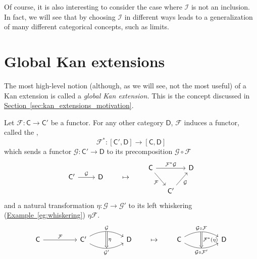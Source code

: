\documentclass[notes.tex]{subfiles}
\begin{document}
Of course, it is also interesting to consider the case where $\mathcal{I}$ is not an inclusion. In fact, we will see that by choosing $\mathcal{I}$ in different ways leads to a generalization of many different categorical concepts, such as limits.

\section{Global Kan extensions}
\label{sec:global_kan_extensions}

The most high-level notion (although, as we will see, not the most useful) of a Kan extension is called a \emph{global Kan extension.} This is the concept discussed in \hyperref[sec:kan_extensions_motivation]{Section~\ref*{sec:kan_extensions_motivation}}.

\begin{definition}[pullback]
  \label{def:pullback}
  Let $\mathcal{F}\colon \mathsf{C} \to \mathsf{C}'$ be a functor. For any other category $\mathsf{D}$, $\mathcal{F}$ induces a functor, called the ,
  \begin{equation*}
    \mathcal{F}^{*}\colon [\mathsf{C}', \mathsf{D}] \to [\mathsf{C}, \mathsf{D}]
  \end{equation*}
  which sends a functor $\mathcal{G}\colon \mathsf{C}' \to \mathsf{D}$ to its precomposition $\mathcal{G} \circ \mathcal{F}$
  \begin{equation*}
    \begin{tikzcd}
      \mathsf{C}'
      \arrow[r, "\mathcal{G}"]
      & \mathsf{D}
    \end{tikzcd}
    \qquad
    \mapsto
    \qquad
    \begin{tikzcd}[column sep=small]
      \mathsf{C}
      \arrow[dr, swap, "\mathcal{F}"]
      \arrow[rr, "\mathcal{F}^{*}\mathcal{G}"]
      && \mathsf{D}
      \\
      & \mathsf{C'}
      \arrow[ur, swap, "\mathcal{G}"]
    \end{tikzcd}
  \end{equation*}
  and a natural transformation $\eta\colon \mathcal{G} \to \mathcal{G}'$ to its left whiskering (\hyperref[eg:whiskering]{Example~\ref*{eg:whiskering}}) $\eta\mathcal{F}$.
  \begin{equation*}
    \begin{tikzcd}[column sep=huge]
      \mathsf{C}
      \arrow[r, "\mathcal{F}"]
      &\mathsf{C}'
      \arrow[r, bend left, "\mathcal{G}"{name=U}]
      \arrow[r, bend right, swap, "\mathcal{G}'"{name=D}]
      & \mathsf{D}
      \arrow[from=U, to=D, Rightarrow, "\eta"]
    \end{tikzcd}
    \qquad
    \mapsto
    \qquad
    \begin{tikzcd}[column sep=huge]
      \mathsf{C}
      \arrow[r, bend left, "\mathcal{G} \circ \mathcal{F}"{name=U}]
      \arrow[r, bend right, swap, "\mathcal{G} \circ \mathcal{F}'"{name=D}]
      & \mathsf{D}
      \arrow[from=U, to=D, Rightarrow, "\mathcal{F}^{*}(\eta)"]
    \end{tikzcd}
  \end{equation*}
\end{definition}
\end{document}
